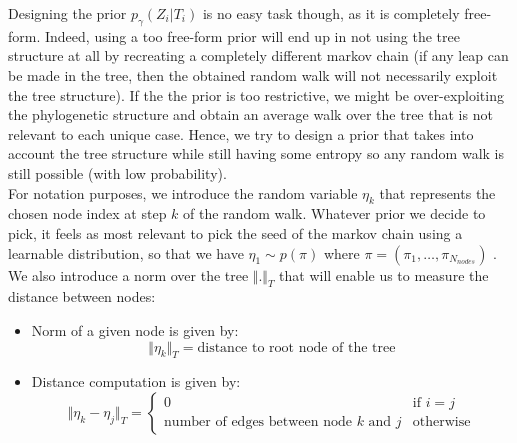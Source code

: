 Designing the prior $p_{\gamma}(Z_i | T_i)$ is no easy task though, as it is completely free-form.
Indeed, using a too free-form prior will end up in not using the tree structure at all by recreating a completely different markov chain
(if any leap can be made in the tree, then the obtained random walk will not necessarily exploit the tree structure).
If the the prior is too restrictive, we might be over-exploiting the phylogenetic structure and obtain an average walk over the tree that is not relevant to each unique case.
Hence, we try to design a prior that takes into account the tree structure while still having some entropy so any random walk is still possible (with low probability).\\

For notation purposes, we introduce the random variable $\eta_k$ that represents the chosen node index at step $k$ of the random walk.
Whatever prior we decide to pick, it feels as most relevant to pick the seed of the markov chain using a learnable distribution,
so that we have $\eta_{1} \sim p(\pi)$ where $\pi = (\pi_1, \dots, \pi_{N_{nodes}})$ .
We also introduce a norm over the tree $\Vert . \Vert_T$ that will enable us to measure the distance between nodes:
\begin{itemize}
    \item Norm of a given node is given by:
        $$
        \Vert \eta_k \Vert_T = \text{distance to root node of the tree}
        $$
    \item Distance computation is given by:
          $$
            \Vert \eta_k - \eta_j \Vert_T = \left\{
            \begin{array}{ll}
                0 & \mbox{if } i = j \\
                \text{number of edges between node $k$ and $j$} & \mbox{otherwise}
            \end{array}
            \right.
          $$
\end{itemize}

